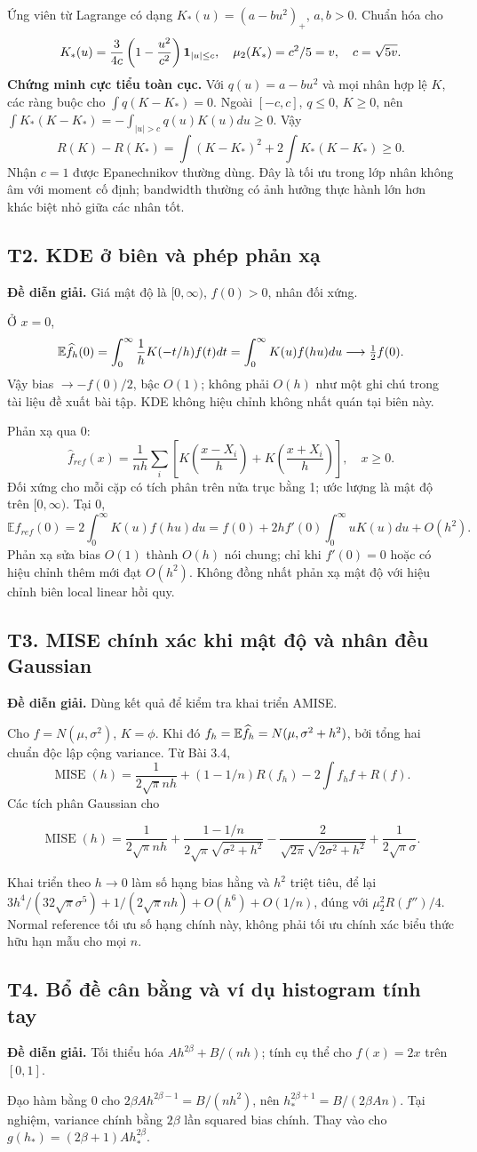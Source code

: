 \documentclass[11pt,a4paper]{article}
\newcommand{\E}{\mathbb E}\newcommand{\Pp}{\mathbb P}
\DeclareMathOperator{\MISE}{MISE}\DeclareMathOperator{\AMISE}{AMISE}
\newcommand{\supp}[3]{\subsection{#1. #2}\label{s:#1}\textbf{Đề diễn giải.} #3\par}
\begin{document}
Ứng viên từ Lagrange có dạng $K_*(u)=(a-bu^2)_+$, $a,b>0$. Chuẩn hóa cho
\[
K_*(u)=\frac3{4c}\left(1-\frac{u^2}{c^2}\right)\mathbf 1_{|u|\le c},\quad
\mu_2(K_*)=c^2/5=v,\quad c=\sqrt{5v}.
\]
\textbf{Chứng minh cực tiểu toàn cục.} Với $q(u)=a-bu^2$ và mọi nhân hợp lệ $K$, các ràng buộc cho $\int q(K-K_*)=0$. Ngoài $[-c,c]$, $q\le0$, $K\ge0$, nên
$\int K_*(K-K_*)=-\int_{|u|>c}q(u)K(u)du\ge0$.
Vậy
\[
R(K)-R(K_*)=\int(K-K_*)^2+2\int K_*(K-K_*)\ge0.
\]
Nhận $c=1$ được Epanechnikov thường dùng. Đây là tối ưu trong lớp nhân không âm với moment cố định; bandwidth thường có ảnh hưởng thực hành lớn hơn khác biệt nhỏ giữa các nhân tốt.

\supp{T2}{KDE ở biên và phép phản xạ}{Giá mật độ là $[0,\infty)$, $f(0)>0$, nhân đối xứng.}
Ở $x=0$,
\[
\E\fh(0)=\int_0^\infty\frac1h K(-t/h)f(t)dt
=\int_0^\infty K(u)f(hu)du\longrightarrow\tfrac12 f(0).
\]
Vậy bias $\to-f(0)/2$, bậc $O(1)$; không phải $O(h)$ như một ghi chú trong tài liệu đề xuất bài tập. KDE không hiệu chỉnh không nhất quán tại biên này.

Phản xạ qua 0:
\[
\widehat f_{ref}(x)=\frac1{nh}\sum_i\left[K\left(\frac{x-X_i}{h}\right)+K\left(\frac{x+X_i}{h}\right)\right],\quad x\ge0.
\]
Đối xứng cho mỗi cặp có tích phân trên nửa trục bằng 1; ước lượng là mật độ trên $[0,\infty)$. Tại 0,
\[
\E\widehat f_{ref}(0)=2\int_0^\infty K(u)f(hu)du
=f(0)+2hf'(0)\int_0^\infty uK(u)du+O(h^2).
\]
Phản xạ sửa bias $O(1)$ thành $O(h)$ nói chung; chỉ khi $f'(0)=0$ hoặc có hiệu chỉnh thêm mới đạt $O(h^2)$. Không đồng nhất phản xạ mật độ với hiệu chỉnh biên local linear hồi quy.

\supp{T3}{MISE chính xác khi mật độ và nhân đều Gaussian}{Dùng kết quả để kiểm tra khai triển AMISE.}
Cho $f=N(\mu,\sigma^2)$, $K=\phi$. Khi đó $f_h=\E\fh=N(\mu,\sigma^2+h^2)$, bởi tổng hai chuẩn độc lập cộng variance. Từ Bài 3.4,
\[
\MISE(h)=\frac1{2\sqrt\pi nh}+(1-1/n)R(f_h)-2\int f_hf+R(f).
\]
Các tích phân Gaussian cho
\begin{result}
\[
\MISE(h)=\frac1{2\sqrt\pi nh}
+\frac{1-1/n}{2\sqrt\pi\sqrt{\sigma^2+h^2}}
-\frac2{\sqrt{2\pi}\sqrt{2\sigma^2+h^2}}
+\frac1{2\sqrt\pi\sigma}.
\]
\end{result}
Khai triển theo $h\to0$ làm số hạng bias hằng và $h^2$ triệt tiêu, để lại
$3h^4/(32\sqrt\pi\sigma^5)+1/(2\sqrt\pi nh)+O(h^6)+O(1/n)$, đúng với $\mu_2^2R(f'')/4$.
Normal reference tối ưu số hạng chính này, không phải tối ưu chính xác biểu thức hữu hạn mẫu cho mọi $n$.

\supp{T4}{Bổ đề cân bằng và ví dụ histogram tính tay}{Tối thiểu hóa $Ah^{2\beta}+B/(nh)$; tính cụ thể cho $f(x)=2x$ trên $[0,1]$.}
Đạo hàm bằng 0 cho $2\beta Ah^{2\beta-1}=B/(nh^2)$, nên
$h_*^{2\beta+1}=B/(2\beta An)$. Tại nghiệm, variance chính bằng $2\beta$ lần squared bias chính. Thay vào cho $g(h_*)=(2\beta+1)Ah_*^{2\beta}$.
\end{document}
